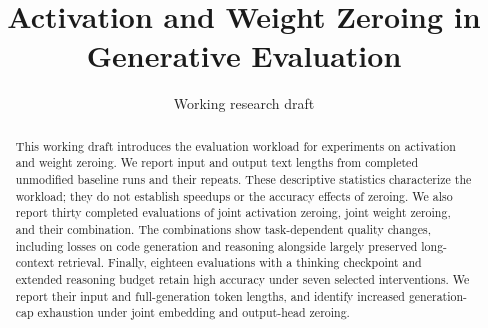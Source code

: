 \documentclass[11pt]{article}
\title{Activation and Weight Zeroing in Generative Evaluation}
\author{Working research draft}
\date{}
\begin{document}
\maketitle
\begin{abstract}
This working draft introduces the evaluation workload for experiments on
activation and weight zeroing. We report input and output text lengths from
completed unmodified baseline runs and their repeats. These descriptive
statistics characterize the workload; they do not establish speedups or the
accuracy effects of zeroing. We also report thirty completed evaluations of
joint activation zeroing, joint weight zeroing, and their combination. The
combinations show task-dependent quality changes, including losses on code
generation and reasoning alongside largely preserved long-context retrieval.
Finally, eighteen evaluations with a thinking checkpoint and extended reasoning
budget retain high accuracy under seven selected interventions. We report their
input and full-generation token lengths, and identify increased generation-cap
exhaustion under joint embedding and output-head zeroing.
\end{abstract}




\end{document}
